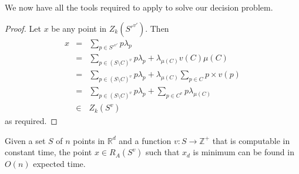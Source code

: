 \documentclass[lotsofwhite]{patmorin}
\begin{document}
We now have all the tools required to apply  to solve our
decision problem.
\begin{proof}
Let $x$ be any point in $Z_k(S'^{v'})$.  Then
\begin{eqnarray*}
    x &=& \sum_{p\in S'^{v'}} p\lambda_p \\
      &=& \sum_{p\in (S\setminus C)^v} p\lambda_p 
          + \lambda_{\mu(C)}v(C)\mu(C) \\
      &=& \sum_{p\in (S\setminus C)^v} p\lambda_p 
          + \lambda_{\mu(C)}\sum_{p\in C} p\times v(p) \\
      &=& \sum_{p\in (S\setminus C)^v} p\lambda_p  
          + \sum_{p\in C^v}p\lambda_{\mu(C)} \\
      &\in& Z_k(S^{v})
\end{eqnarray*}
as required.
\end{proof}

\begin{thm}
Given a set $S$ of $n$ points in $\mathbb{R}^d$ and a 
function $v:S\rightarrow\mathbb{Z}^+$ that is computable in constant
time, the point $x\in R_A(S^v)$ such
that $x_d$ is minimum can be found in $O(n)$ expected
time.
\end{thm}
\end{document}
